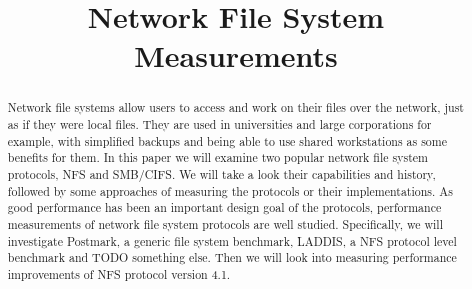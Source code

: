 \documentclass[conference,a4paper]{IEEEtran}
\begin{document}
%
\title{Network File System Measurements}


\author{
}

\maketitle

\begin{abstract}
Network file systems allow users to access and work on their files over the network,
just as if they were local files.
They are used in universities and large corporations for example,
with simplified backups and being able to use shared workstations as some benefits for them.
In this paper we will examine two popular network file system protocols, NFS and SMB/CIFS.
We will take a look their capabilities and history,
followed by some approaches of measuring the protocols or their implementations.
As good performance has been an important design goal of the protocols,
performance measurements of network file system protocols are well studied.
Specifically, we will investigate Postmark, a generic file system benchmark,
LADDIS, a NFS protocol level benchmark and TODO something else.
Then we will look into measuring performance improvements of NFS protocol version 4.1.
\end{abstract}








\end{document}
